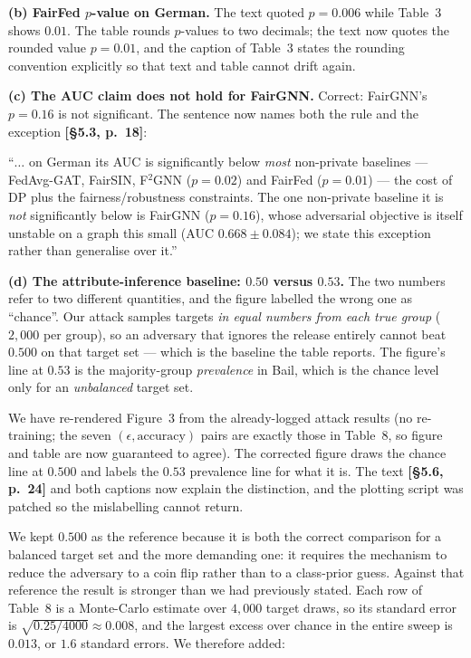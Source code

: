 \documentclass[11pt,a4paper]{article}
\newenvironment{newtextbox}
  {\begin{mdframed}[linecolor=newtext!45,linewidth=0.8pt,skipabove=6pt,
    skipbelow=8pt,innertopmargin=6pt,innerbottommargin=6pt]\small}
  {\end{mdframed}}
\newcommand{\where}[1]{\textcolor{revblue}{\textbf{[#1]}}}
\begin{document}
\textbf{(b) FairFed $p$-value on German.} The text quoted $p{=}0.006$ while Table~3 shows $0.01$. The table rounds $p$-values to two decimals; the text now
quotes the rounded value $p{=}0.01$, and the caption of Table~3 states the
rounding convention explicitly so that text and table cannot drift again.

\textbf{(c) The AUC claim does not hold for FairGNN.} Correct: FairGNN's
$p{=}0.16$ is not significant. The sentence now names both the rule and the
exception \where{\S5.3, p.~18}:

\begin{newtextbox}
``$\dots$ on German its AUC is significantly below \emph{most} non-private
baselines --- FedAvg-GAT, FairSIN, F$^2$GNN ($p{=}0.02$) and FairFed
($p{=}0.01$) --- the cost of DP plus the fairness/robustness constraints. The one
non-private baseline it is \emph{not} significantly below is FairGNN
($p{=}0.16$), whose adversarial objective is itself unstable on a graph this
small (AUC $0.668\pm0.084$); we state this exception rather than generalise over
it.''
\end{newtextbox}

\textbf{(d) The attribute-inference baseline: $0.50$ versus $0.53$.} The two
numbers refer to two different quantities, and the figure labelled the wrong one
as ``chance''. Our attack samples targets \emph{in equal numbers from each true
group} ($2{,}000$ per group), so an adversary that ignores the release entirely
cannot beat $0.500$ on that target set --- which is the baseline the table
reports. The figure's line at $0.53$ is the majority-group \emph{prevalence} in
Bail, which is the chance level only for an \emph{unbalanced} target set.

We have re-rendered Figure~3 from the already-logged attack results (no
re-training; the seven $(\epsilon,\text{accuracy})$ pairs are exactly those in
Table~8, so figure and table are now guaranteed to agree). The corrected figure
draws the chance line at $0.500$ and labels the $0.53$ prevalence line for what
it is. The text \where{\S5.6, p.~24} and both captions now explain the
distinction, and the plotting script was patched so the mislabelling cannot
return.

We kept $0.500$ as the reference because it is both the correct comparison for a
balanced target set and the more demanding one: it requires the mechanism to
reduce the adversary to a coin flip rather than to a class-prior guess. Against
that reference the result is stronger than we had previously stated. Each row of
Table~8 is a Monte-Carlo estimate over $4{,}000$ target draws, so its standard
error is $\sqrt{0.25/4000}\approx0.008$, and the largest excess over chance in
the entire sweep is $0.013$, or $1.6$ standard errors. We therefore added:
\end{document}
